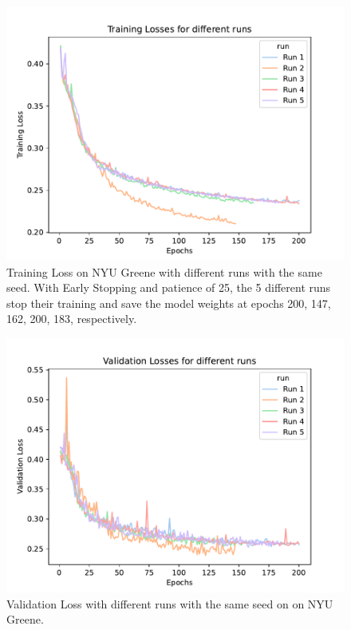 \documentclass[sigplan,screen]{acmart}
\begin{document}

\begin{figure}[htb]
\centering\includegraphics[width=1.0\columnwidth]{images/training_loss_diff_runs.pdf}
\caption{Training Loss on NYU Greene with different runs with the same seed. With Early Stopping and patience of 25, the 5 different runs stop their training and save the model weights at epochs 200, 147, 162, 200, 183, respectively.}
\label{fig:Training loss}
\end{figure}

\begin{figure}[htb]
\centering\includegraphics[width=1.0\columnwidth]{images/validation_loss_diff_runs.pdf}
\caption{Validation Loss with different runs with the same seed on on NYU Greene.}
\label{fig:Validation loss}
\end{figure}
\end{document}

